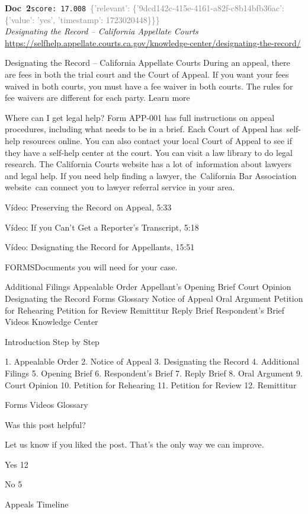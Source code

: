\documentclass[a4paper,11pt]{article}
\begin{document}
\begin{docenv}
{\footnotesize\textcolor{doccolor}{\textbf{Doc~2}}}\hfill{\tiny\texttt{score:~17.008}}\ {\tiny\textcolor{gray}{\{'relevant': \{'9dcd142c-415e-4161-a82f-c8b14bfb36ac': \{'value': 'yes', 'timestamp': 1723020448\}\}\}}}\\[3pt]
{\small\textit{Designating the Record – California Appellate Courts}}\\[2pt]
{\tiny\url{https://selfhelp.appellate.courts.ca.gov/knowledge-center/designating-the-record/}}\\[4pt]
{\footnotesize Designating the Record – California Appellate Courts
During an appeal, there are fees in both the trial court and the Court of Appeal. If you want your fees waived in both courts, you must have a fee waiver in both courts.
The rules for fee waivers are different for each party. Learn more
 
 Where can I get legal help? Form APP-001 has full instructions on appeal procedures, including what needs to be in a brief.
Each Court of Appeal has self-help resources online. You can also contact your local Court of Appeal to see if they have a self-help center at the court.
You can visit a law library to do legal research.
The California Courts website has a lot of information about lawyers and legal help.
If you need help finding a lawyer, the California Bar Association website can connect you to lawyer referral service in your area.
 

Vídeo: Preserving the Record on Appeal, 5:33

Vídeo: If you Can’t Get a Reporter’s Transcript, 5:18

Vídeo: Designating the Record for Appellants, 15:51

FORMSDocuments you will need for your case.

 

Additional Filings
Appealable Order
Appellant’s Opening Brief
Court Opinion
Designating the Record
Forms
Glossary
Notice of Appeal
Oral Argument
Petition for Rehearing
Petition for Review
Remittitur
Reply Brief
Respondent’s Brief
Videos
Knowledge Center

Introduction
Step by Step

1. Appealable Order
2. Notice of Appeal
3. Designating the Record
4. Additional Filings
5. Opening Brief
6. Respondent’s Brief
7. Reply Brief
8. Oral Argument
9. Court Opinion
10. Petition for Rehearing
11. Petition for Review
12. Remittitur

Forms
Videos
Glossary

Was this post helpful?

Let us know if you liked the post. That’s the only way we can improve.


	Yes	12 


	No	5 

Appeals Timeline}
\end{docenv}
\end{document}
